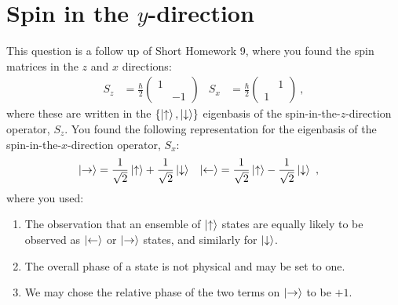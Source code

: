 \section{\texorpdfstring{Spin in the $y$-direction}{Spin in the y-direction}}

This question is a follow up of Short Homework 9, where you found the spin matrices in the $z$ and $x$ directions:
\begin{align}
    S_z &= \frac{\hbar}{2}
    \begin{pmatrix}
        1 & \\ & -1 
    \end{pmatrix}
    &
    S_x &= 
    \frac{\hbar}{2}
    \begin{pmatrix}
         & 1\\ 1 &  
    \end{pmatrix} \ ,
\end{align}
where these are written in the $\{\left|\uparrow\right\rangle,\left|\downarrow\right\rangle\}$ eigenbasis of the spin-in-the-$z$-direction operator, $S_z$. You found the following representation for the eigenbasis of the spin-in-the-$x$-direction operator, $S_x$:
\begin{align}
    \left|\rightarrow\right\rangle &= 
    \frac{1}{\sqrt{2}}\left|\uparrow\right\rangle + \frac{1}{\sqrt{2}}\left|\downarrow\right\rangle
    &
    \left|\leftarrow\right\rangle &= 
    \frac{1}{\sqrt{2}}\left|\uparrow\right\rangle - \frac{1}{\sqrt{2}}\left|\downarrow\right\rangle
    \ ,
\end{align}
where you used:
\begin{enumerate}
    \item The observation that an ensemble of $\left|\uparrow\right\rangle$ states are equally likely to be observed as $\left|\leftarrow\right\rangle$ or $\left|\rightarrow\right\rangle$ states, and similarly for $\left|\downarrow\right\rangle$.
    \item The overall phase of a state is not physical and may be set to one.
    \item We may chose the relative phase of the two terms on $\left|\rightarrow\right\rangle$ to be $+1$. 
\end{enumerate}


